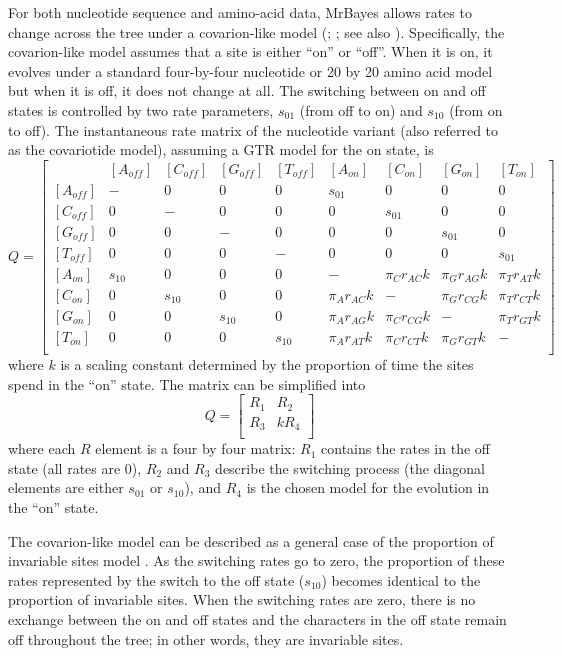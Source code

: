 \documentclass[12pt]{book}
\begin{document}
For both nucleotide sequence and amino-acid data, MrBayes allows rates to change across the tree
under a covarion-like model (\citet{tuffley98}; \citet{huelsenbeck02a}; see also
\citet{galtier01}). Specifically, the covarion-like model assumes that a site is either ``on'' or
``off''. When it is on, it evolves under a standard four-by-four nucleotide or 20 by 20 amino acid
model but when it is off, it does not change at all. The switching between on and off states is
controlled by two rate parameters, $s_{01}$ (from off to on) and $s_{10}$ (from on to off). The
instantaneous rate matrix of the nucleotide variant (also referred to as the covariotide model),
assuming a GTR model for the on state, is
\footnotesize
\[
Q=\begin{bmatrix}
    & [A_{off}] & [C_{off}] & [G_{off}] & [T_{off}] & [A_{on}] & [C_{on}] & [G_{on}] & [T_{on}]\\
 [A_{off}]& - & 0 & 0 & 0 & s_{01} & 0 & 0 & 0 \\
 [C_{off}]& 0 & - & 0 & 0 & 0 & s_{01} & 0 & 0 \\
 [G_{off}]& 0 & 0 & - & 0 & 0 & 0 & s_{01} & 0 \\
 [T_{off}]& 0 & 0 & 0 & - & 0 & 0 & 0 & s_{01} \\
 [A_{on}]& s_{10} & 0 & 0 & 0 & - & \pi_C r_{AC} k  & \pi_G r_{AG} k & \pi_T r_{AT} k  \\
 [C_{on}]& 0 & s_{10} & 0 & 0 & \pi_A r_{AC} k  & - & \pi_G r_{CG} k & \pi_T r_{CT} k  \\
 [G_{on}]& 0 & 0 & s_{10} & 0 & \pi_A r_{AG} k  & \pi_C r_{CG} k & - & \pi_T r_{GT} k  \\
 [T_{on}]& 0 & 0 & 0 & s_{10} & \pi_A r_{AT} k  & \pi_C r_{CT} k &  \pi_G r_{GT} k &-  \\
\end{bmatrix}
\]
\normalsize
where $k$ is a scaling constant determined by the proportion of time the sites spend in the ``on''
state. The matrix can be simplified into
\[
Q=\begin{bmatrix}
  R_1 & R_2\\
  R_3 & k R_4\\
\end{bmatrix}
\]
where each $R$ element is a four by four matrix: $R_1$ contains the rates in the off state (all
rates are 0), $R_2$ and $R_3$ describe the switching process (the diagonal elements are either
$s_{01}$ or $s_{10}$), and $R_4$ is the chosen model for the evolution in the ``on'' state.

The covarion-like model can be described as a general case of the proportion of invariable sites
model \citep{huelsenbeck02a}. As the switching rates go to zero, the proportion of these rates
represented by the switch to the off state ($s_{10}$) becomes identical to the proportion of
invariable sites. When the switching rates are zero, there is no exchange between the on and off
states and the characters in the off state remain off throughout the tree; in other words, they are
invariable sites.
\end{document}
